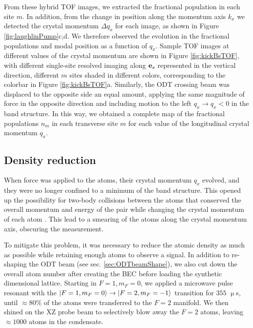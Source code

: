 From these hybrid TOF images, we extracted the fractional population in each site $m$. In addition, from the change in position along the momentum axis $k_x$ we detected the crystal momentum $\Delta q_x$ for each image, as shown in Figure \ref{fig:laughlinPump}c,d.  We therefore observed the evolution in the fractional populations and modal position as a function of $q_x$. Sample TOF images at different values of the crystal momentum are shown in Figure \ref{fig:kickBsTOF}, with different single-site resolved imaging along $\textbf{e}_s{}$ represented in the vertical direction, different $m$ sites shaded in different colors, corresponding to the colorbar in Figure \ref{fig:kickBsTOF}a. Similarly, the ODT crossing beam was displaced to the opposite side an equal amount, applying the same magnitude of force in the opposite direction and including motion to the left  $q_x\rightarrow q_x<0$ in the band structure. In this way, we obtained a complete map of the fractional populations $n_m$ in each transverse site $m$ for each value of the longitudinal crystal momentum $q_x$.

\subsection{Density reduction}
When force was applied to the atoms, their crystal momentum $q_x$ evolved, and they were no longer confined to a minimum of the band structure. This opened up the possibility for two-body collisions between the atoms that conserved the overall momentum and energy of the pair while changing the crystal momentum of each atom \cite{Campbell2006}. This lead to a smearing of the atoms along the crystal momentum axis, obscuring the measurement. 

To mitigate this problem, it was necessary to reduce the atomic density as much as possible while retaining enough atoms to observe a signal. In addition to re-shaping the ODT beam (see sec. \ref{sec:ODTbeamShape}), we also cut down the overall atom number after creating the BEC before loading the synthetic dimensional lattice. Starting in $F=1, m_F=0$, we applied a microwave pulse resonant with the $\mathinner{|{F=1,m_F=0}\rangle}\rightarrow\mathinner{|{F=2,m_F=-1}\rangle}$ transition for $355$ $\upmu$s, until $\approx80\%$ of the atoms were transferred to the $F=2$ manifold. We then shined on the XZ probe beam to selectively blow away the $F=2$ atoms, leaving $\approx 1000$ atoms in the condensate.  

